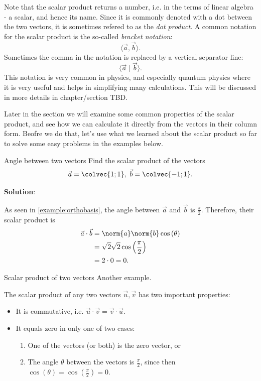 Note that the scalar product returns a number, i.e. in the terms of linear algebra - a scalar, and hence its name. Since it is commonly denoted with a dot between the two vectors, it is sometimes refered to as the \emph{dot product}. A common notation for the scalar product is the so-called \emph{bracket notation}:
\[
	\langle \vec{a},\vec{b} \rangle.
\]
Sometimes the comma in the notation is replaced by a vertical separator line:
\[
	\langle \vec{a}\mid\vec{b} \rangle.
\]
This notation is very common in physics, and especially quantum physics where it is very useful and helps in simplifying many calculations. This will be discussed in more details in chapter/section TBD.

Later in the section we will examine some common properties of the scalar product, and see how we can calculate it directly from the vectors in their column form. Beofre we do that, let's use what we learned about the scalar product so far to solve some easy problems in the examples below.

\begin{example}{Angle between two vectors}{}
	Find the scalar product of the vectors
	\[
		\vec{a} = \colvec{1;1},\ \vec{b}=\colvec{-1;1}.
	\]

	\textbf{Solution}:
	
	As seen in \autoref{example:orthobasis}, the angle between $\vec{a}$ and $\vec{b}$ is $\frac{\pi}{2}$. Therefore, their scalar product is 
	\begin{align*}
		\vec{a}\cdot\vec{b} &= \norm{a}\norm{b}\cos\left(\theta\right)\\
		&= \sqrt{2}\sqrt{2}\cos\left( \frac{\pi}{2} \right)\\
		&= 2\cdot0 = 0.
	\end{align*}
\end{example}

\begin{example}{Scalar product of two vectors}{}
	Another example.
\end{example}

The scalar product of any two vectors $\vec{u},\vec{v}$ has two important properties:
\begin{itemize}
	\item It is commutative, i.e. $\vec{u}\cdot\vec{v} = \vec{v}\cdot\vec{u}$.
	\item It equals zero in only one of two cases:
		\begin{enumerate}
			\item One of the vectors (or both) is the zero vector, or
			\item The angle $\theta$ between the vectors is $\frac{\pi}{2}$, since then $\cos(\theta)=\cos\left(\frac{\pi}{2}\right)=0$.
		\end{enumerate}
\end{itemize}

